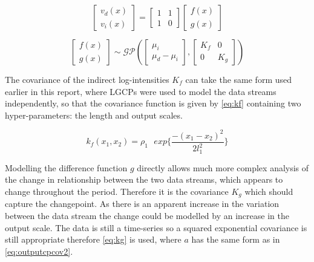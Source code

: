 \documentclass[a4paper,11pt]{report}
\begin{document}
\begin{equation} 
\left[ \begin{array}{cc}
v_{d}(x)  \\
v_{i}(x) \end{array} \right] = \left[ \begin{array}{cc}
1 & 1  \\
1  & 0 \end{array} \right] \left[ \begin{array}{cc}
f(x)  \\
g(x) \end{array} \right]
\end{equation}

\begin{equation} \label{eq:ccpfandg}
\left[ \begin{array}{cc}
f(x)  \\
g(x) \end{array} \right] \sim \mathcal{G}\mathcal{P} \left( \left[ \begin{array}{cc}
\mu_i  \\
\mu_d - \mu_i \end{array} \right], \left[ \begin{array}{cc}
K_f & 0  \\
0  & K_g \end{array} \right] \right)
\end{equation}

The covariance of the indirect log-intensities \(K_f\) can take the same form used earlier in this report, where LGCPs were used to model the data streams independently, so that the covariance function is given by \ref{eq:kf} containing two hyper-parameters: the length and output scales. 

\begin{equation} \label{eq:kf}
k_f(x_1,x_2) = \rho_1 \text{ }exp\{\frac{-(x_1-x_2)^2}{2 l_1^2}\}
\end{equation}

Modelling the difference function \(g\) directly allows much more complex analysis of the change in relationship between the two data streams, which appears to change throughout the period. Therefore it is the covariance \(K_g\) which should capture the changepoint. As there is an apparent increase in the variation between the data stream the change could be modelled by an increase in the output scale. The data is still a time-series so a squared exponential covariance is still appropriate therefore \ref{eq:kg} is used, where \(a\) has the same form as in \ref{eq:outputcpcov2}.
\end{document}
